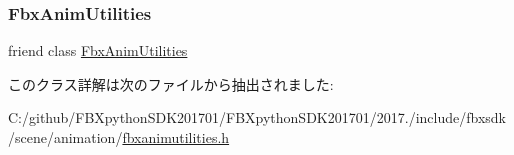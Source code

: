 \subsubsection{\texorpdfstring{Fbx\+Anim\+Utilities}{FbxAnimUtilities}}
{\footnotesize\ttfamily friend class \hyperlink{class_fbx_anim_utilities}{Fbx\+Anim\+Utilities}\hspace{0.3cm}{\ttfamily [friend]}}



このクラス詳解は次のファイルから抽出されました\+:\begin{DoxyCompactItemize}
\item 
C\+:/github/\+F\+B\+Xpython\+S\+D\+K201701/\+F\+B\+Xpython\+S\+D\+K201701/2017./include/fbxsdk/scene/animation/\hyperlink{fbxanimutilities_8h}{fbxanimutilities.\+h}\end{DoxyCompactItemize}
